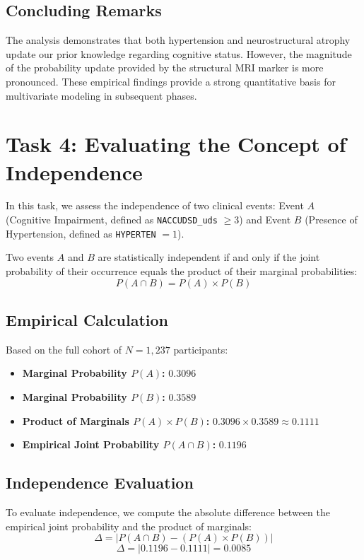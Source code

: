 \documentclass[11pt, a4paper]{article}
\begin{document}
\subsection{Concluding Remarks}
The analysis demonstrates that both hypertension and neurostructural atrophy update our prior knowledge regarding cognitive status. However, the magnitude of the probability update provided by the structural MRI marker is more pronounced. These empirical findings provide a strong quantitative basis for multivariate modeling in subsequent phases.

\section{Task 4: Evaluating the Concept of Independence}
In this task, we assess the independence of two clinical events: Event $A$ (Cognitive Impairment, defined as \texttt{NACCUDSD\_uds} $\ge 3$) and Event $B$ (Presence of Hypertension, defined as \texttt{HYPERTEN} $= 1$).

Two events $A$ and $B$ are statistically independent if and only if the joint probability of their occurrence equals the product of their marginal probabilities:
\[
P(A \cap B) = P(A) \times P(B)
\]

\subsection{Empirical Calculation}
Based on the full cohort of $N = 1,237$ participants:
\begin{itemize}
    \item \textbf{Marginal Probability $P(A)$:} $0.3096$
    \item \textbf{Marginal Probability $P(B)$:} $0.3589$
    \item \textbf{Product of Marginals $P(A) \times P(B)$:} $0.3096 \times 0.3589 \approx 0.1111$
    \item \textbf{Empirical Joint Probability $P(A \cap B)$:} $0.1196$
\end{itemize}

\subsection{Independence Evaluation}
To evaluate independence, we compute the absolute difference between the empirical joint probability and the product of marginals:
\[
\Delta = |P(A \cap B) - (P(A) \times P(B))|
\]
\[
\Delta = |0.1196 - 0.1111| = 0.0085
\]
\end{document}

